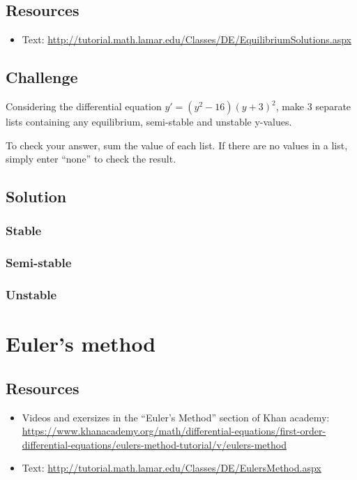 \subsection*{Resources}
\begin{itemize}
    \item Text: \url{http://tutorial.math.lamar.edu/Classes/DE/EquilibriumSolutions.aspx}
\end{itemize}

\subsection*{Challenge}
Considering the differential equation $y'=(y^2-16)(y+3)^2$, make 3 separate lists containing any equilibrium, semi-stable and unstable y-values.

To check your answer, sum the value of each list. If there are no values in a list, simply enter ``none'' to check the result.

\subsection*{Solution}
\subsubsection*{Stable}
\six{}


\subsubsection*{Semi-stable}
\six{}


\subsubsection*{Unstable}
\six{}


\timebox



\newpage
\section{Euler's method}

\subsection*{Resources}
\begin{itemize}
    \item Videos and exersizes in the ``Euler's Method'' section of Khan academy: \url{https://www.khanacademy.org/math/differential-equations/first-order-differential-equations/eulers-method-tutorial/v/eulers-method}
    \item Text: \url{http://tutorial.math.lamar.edu/Classes/DE/EulersMethod.aspx}
\end{itemize}

